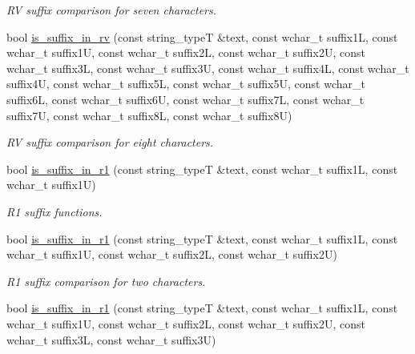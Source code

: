 \begin{DoxyCompactItemize}
\begin{DoxyCompactList}\small\item\em R\+V suffix comparison for seven characters. \end{DoxyCompactList}\item 
\hypertarget{classstemming_1_1stem_a553b6ed34e6b03e2c1ca42ea2db08ba6}{bool \hyperlink{classstemming_1_1stem_a553b6ed34e6b03e2c1ca42ea2db08ba6}{is\+\_\+suffix\+\_\+in\+\_\+rv} (const string\+\_\+type\+T \&text, const wchar\+\_\+t suffix1\+L, const wchar\+\_\+t suffix1\+U, const wchar\+\_\+t suffix2\+L, const wchar\+\_\+t suffix2\+U, const wchar\+\_\+t suffix3\+L, const wchar\+\_\+t suffix3\+U, const wchar\+\_\+t suffix4\+L, const wchar\+\_\+t suffix4\+U, const wchar\+\_\+t suffix5\+L, const wchar\+\_\+t suffix5\+U, const wchar\+\_\+t suffix6\+L, const wchar\+\_\+t suffix6\+U, const wchar\+\_\+t suffix7\+L, const wchar\+\_\+t suffix7\+U, const wchar\+\_\+t suffix8\+L, const wchar\+\_\+t suffix8\+U)}\label{classstemming_1_1stem_a553b6ed34e6b03e2c1ca42ea2db08ba6}

\begin{DoxyCompactList}\small\item\em R\+V suffix comparison for eight characters. \end{DoxyCompactList}\item 
bool \hyperlink{classstemming_1_1stem_aefe544e653b27bd5c1fab7b5a18d80a1}{is\+\_\+suffix\+\_\+in\+\_\+r1} (const string\+\_\+type\+T \&text, const wchar\+\_\+t suffix1\+L, const wchar\+\_\+t suffix1\+U)
\begin{DoxyCompactList}\small\item\em R1 suffix functions. \end{DoxyCompactList}\item 
\hypertarget{classstemming_1_1stem_ab8cb2e00b39091f74b1064e1f0314c6f}{bool \hyperlink{classstemming_1_1stem_ab8cb2e00b39091f74b1064e1f0314c6f}{is\+\_\+suffix\+\_\+in\+\_\+r1} (const string\+\_\+type\+T \&text, const wchar\+\_\+t suffix1\+L, const wchar\+\_\+t suffix1\+U, const wchar\+\_\+t suffix2\+L, const wchar\+\_\+t suffix2\+U)}\label{classstemming_1_1stem_ab8cb2e00b39091f74b1064e1f0314c6f}

\begin{DoxyCompactList}\small\item\em R1 suffix comparison for two characters. \end{DoxyCompactList}\item 
\hypertarget{classstemming_1_1stem_a1fe4a63adfa5d4f378a060352d52edc1}{bool \hyperlink{classstemming_1_1stem_a1fe4a63adfa5d4f378a060352d52edc1}{is\+\_\+suffix\+\_\+in\+\_\+r1} (const string\+\_\+type\+T \&text, const wchar\+\_\+t suffix1\+L, const wchar\+\_\+t suffix1\+U, const wchar\+\_\+t suffix2\+L, const wchar\+\_\+t suffix2\+U, const wchar\+\_\+t suffix3\+L, const wchar\+\_\+t suffix3\+U)}\label{classstemming_1_1stem_a1fe4a63adfa5d4f378a060352d52edc1}


\end{DoxyCompactItemize}
